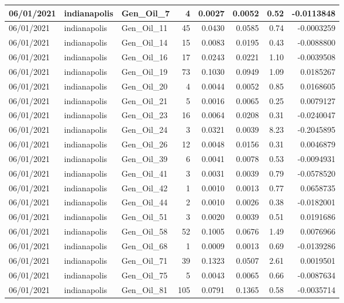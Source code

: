 \documentclass[
  letterpaper,
  DIV=11,
  numbers=noendperiod]{scrartcl}
\begin{document}
\begin{tabular}{l|l|l|r|r|r|r|r}
\hline
06/01/2021 & indianapolis & Gen\_Oil\_7 & 4 & 0.0027 & 0.0052 & 0.52 & -0.0113848\\
\hline
06/01/2021 & indianapolis & Gen\_Oil\_11 & 45 & 0.0430 & 0.0585 & 0.74 & -0.0003259\\
\hline
06/01/2021 & indianapolis & Gen\_Oil\_14 & 15 & 0.0083 & 0.0195 & 0.43 & -0.0088800\\
\hline
06/01/2021 & indianapolis & Gen\_Oil\_16 & 17 & 0.0243 & 0.0221 & 1.10 & -0.0039508\\
\hline
06/01/2021 & indianapolis & Gen\_Oil\_19 & 73 & 0.1030 & 0.0949 & 1.09 & 0.0185267\\
\hline
06/01/2021 & indianapolis & Gen\_Oil\_20 & 4 & 0.0044 & 0.0052 & 0.85 & 0.0168605\\
\hline
06/01/2021 & indianapolis & Gen\_Oil\_21 & 5 & 0.0016 & 0.0065 & 0.25 & 0.0079127\\
\hline
06/01/2021 & indianapolis & Gen\_Oil\_23 & 16 & 0.0064 & 0.0208 & 0.31 & -0.0240047\\
\hline
06/01/2021 & indianapolis & Gen\_Oil\_24 & 3 & 0.0321 & 0.0039 & 8.23 & -0.2045895\\
\hline
06/01/2021 & indianapolis & Gen\_Oil\_26 & 12 & 0.0048 & 0.0156 & 0.31 & 0.0046879\\
\hline
06/01/2021 & indianapolis & Gen\_Oil\_39 & 6 & 0.0041 & 0.0078 & 0.53 & -0.0094931\\
\hline
06/01/2021 & indianapolis & Gen\_Oil\_41 & 3 & 0.0031 & 0.0039 & 0.79 & -0.0578520\\
\hline
06/01/2021 & indianapolis & Gen\_Oil\_42 & 1 & 0.0010 & 0.0013 & 0.77 & 0.0658735\\
\hline
06/01/2021 & indianapolis & Gen\_Oil\_44 & 2 & 0.0010 & 0.0026 & 0.38 & -0.0182001\\
\hline
06/01/2021 & indianapolis & Gen\_Oil\_51 & 3 & 0.0020 & 0.0039 & 0.51 & 0.0191686\\
\hline
06/01/2021 & indianapolis & Gen\_Oil\_58 & 52 & 0.1005 & 0.0676 & 1.49 & 0.0076966\\
\hline
06/01/2021 & indianapolis & Gen\_Oil\_68 & 1 & 0.0009 & 0.0013 & 0.69 & -0.0139286\\
\hline
06/01/2021 & indianapolis & Gen\_Oil\_71 & 39 & 0.1323 & 0.0507 & 2.61 & 0.0019501\\
\hline
06/01/2021 & indianapolis & Gen\_Oil\_75 & 5 & 0.0043 & 0.0065 & 0.66 & -0.0087634\\
\hline
06/01/2021 & indianapolis & Gen\_Oil\_81 & 105 & 0.0791 & 0.1365 & 0.58 & -0.0035714\\

\end{tabular}
\end{document}
